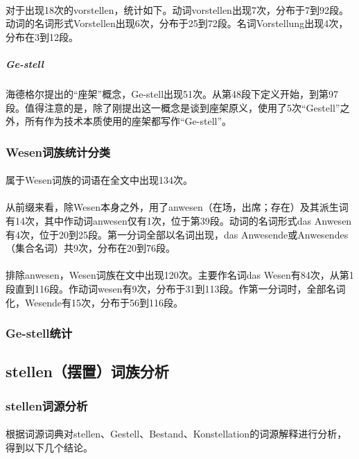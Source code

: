 \documentclass{article}
\begin{document}
			\paragraph{}	
对于出现18次的vorstellen，统计如下。动词vorstellen出现7次，分布于7到92段。动词的名词形式Vorstellen出现6次，分布于25到72段。名词Vorstellung出现4次，分布在3到12段。
			\subparagraph{Ge-stell}	
			海德格尔提出的“座架”概念，Ge-stell出现51次。从第48段下定义开始，到第97段。值得注意的是，除了刚提出这一概念是谈到座架原义，使用了5次“Gestell”之外，所有作为技术本质使用的座架都写作“Ge-stell”。
		\subsubsection{Wesen词族统计分类}
			\paragraph{}
			属于Wesen词族的词语在全文中出现134次。
			\paragraph{}
			从前缀来看，除Wesen本身之外，用了anwesen（在场，出席；存在）及其派生词有14次，其中作动词anwesen仅有1次，位于第39段。动词的名词形式das Anwesen有4次，位于20到25段。第一分词全部以名词出现，das Anwesende或Anwesendes（集合名词）共9次，分布在20到76段。
			\paragraph{}
排除anwesen，Wesen词族在文中出现120次。主要作名词das Wesen有84次，从第1段直到116段。作动词wesen有9次，分布于31到113段。作第一分词时，全部名词化，Wesende有15次，分布于56到116段。
		\subsubsection{Ge-stell统计}
			\paragraph{}
	\subsection{stellen（摆置）词族分析} 
		\subsubsection{stellen词源分析}
			\paragraph{}
		根据词源词典对stellen、Gestell、Bestand、Konstellation的词源解释进行分析，得到以下几个结论。
\end{document}
